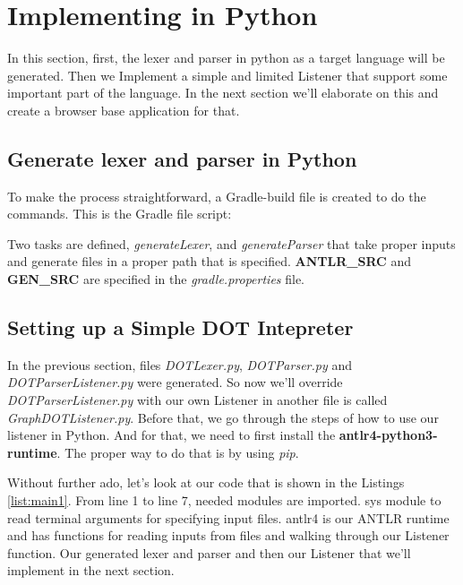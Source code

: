 \section{Implementing in Python}
In this section, first, the lexer and parser in 
python as a target language will be generated. Then
we Implement a simple and limited Listener that support
some important part of the language. In the next
section we'll elaborate on this and create a browser
base application for that. 
\subsection{Generate lexer and parser in Python}
To make the process straightforward, a 
Gradle-build file is created to do the 
commands. This is the Gradle file script:


Two tasks are defined, \textit{generateLexer}, and 
\textit{generateParser} that take proper inputs and 
generate files in a proper path that is 
specified. \textbf{ANTLR_SRC} and 
\textbf{GEN_SRC} are specified in the 
\textit{gradle.properties} file.

\subsection{Setting up a Simple DOT Intepreter}
In the previous section, files 
\textit{DOTLexer.py}, \textit{DOTParser.py} 
and \textit{DOTParserListener.py} were 
generated. So now we'll override 
\textit{DOTParserListener.py} with our own 
Listener in another file is called \textit{GraphDOTListener.py}. Before that, we go through the 
steps of how to use our listener in Python. 
And for that, we need to first install the 
\textbf{antlr4-python3-runtime}. The proper way 
to do that is by using \textit{pip}.


Without further ado, let's look at our code 
that is shown in the Listings \ref{list:main1}. 
From line 1 to line 7, needed modules are 
imported. sys module to read terminal 
arguments for specifying input files. 
antlr4 is our ANTLR runtime and has functions 
for reading inputs from files and walking 
through our Listener function. Our generated 
lexer and parser and then our Listener that 
we'll implement in the next section. 
 

